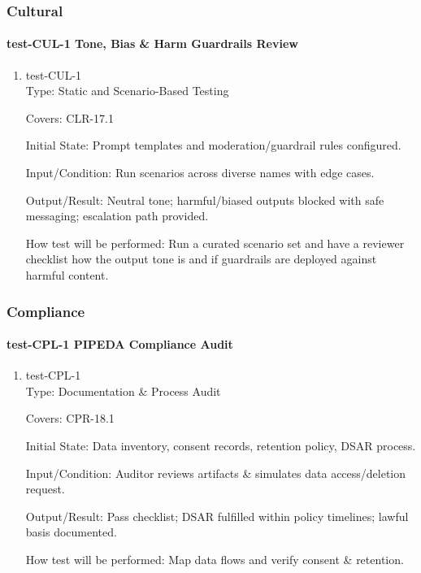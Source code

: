 \documentclass[12pt, titlepage]{article}
\begin{document}
\subsubsection{Cultural}

\paragraph{test-CUL-1 Tone, Bias \& Harm Guardrails Review}

\begin{enumerate}
\item{test-CUL-1\\}
Type: Static and Scenario-Based Testing

Covers: CLR-17.1

Initial State: Prompt templates and moderation/guardrail rules configured.

Input/Condition: Run scenarios across diverse names with edge cases.

Output/Result: Neutral tone; harmful/biased outputs blocked with safe messaging; escalation path provided.

How test will be performed: Run a curated scenario set and have a reviewer checklist how the output tone is and if guardrails are deployed against harmful content.
\end{enumerate}

\subsubsection{Compliance}

\paragraph{test-CPL-1 PIPEDA Compliance Audit}

\begin{enumerate}
\item{test-CPL-1\\}
Type: Documentation \& Process Audit

Covers: CPR-18.1

Initial State: Data inventory, consent records, retention policy, DSAR process.

Input/Condition: Auditor reviews artifacts \& simulates data access/deletion request.

Output/Result: Pass checklist; DSAR fulfilled within policy timelines; lawful basis documented.

How test will be performed: Map data flows and verify consent \& retention.
\end{enumerate}
\end{document}
